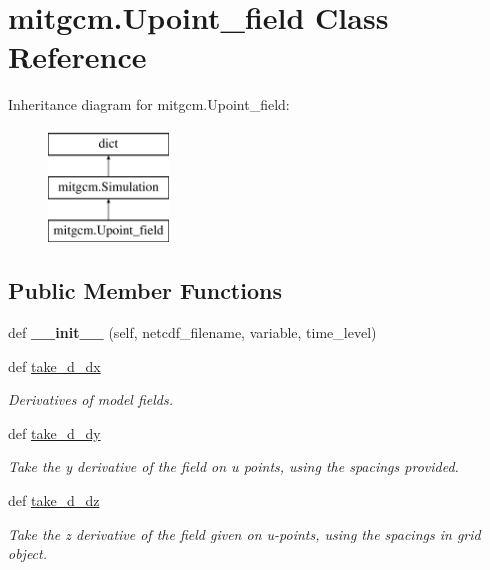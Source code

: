\hypertarget{classmitgcm_1_1Upoint__field}{}\section{mitgcm.\+Upoint\+\_\+field Class Reference}
\label{classmitgcm_1_1Upoint__field}
Inheritance diagram for mitgcm.\+Upoint\+\_\+field\+:\begin{figure}[H]
\begin{center}
\leavevmode
\includegraphics[height=3.000000cm]{classmitgcm_1_1Upoint__field}
\end{center}
\end{figure}
\subsection*{Public Member Functions}
\begin{DoxyCompactItemize}
\item 
\hypertarget{classmitgcm_1_1Upoint__field_a4b4f700e8387298d0a1373285594d0fb}{}def {\bfseries \+\_\+\+\_\+init\+\_\+\+\_\+} (self, netcdf\+\_\+filename, variable, time\+\_\+level)\label{classmitgcm_1_1Upoint__field_a4b4f700e8387298d0a1373285594d0fb}

\item 
def \hyperlink{classmitgcm_1_1Upoint__field_a3f136fd99e5a7ce04aef0f216bd32019}{take\+\_\+d\+\_\+dx}
\begin{DoxyCompactList}\small\item\em Derivatives of model fields. \end{DoxyCompactList}\item 
def \hyperlink{classmitgcm_1_1Upoint__field_acf9bf315e3d31834781c0642086a7802}{take\+\_\+d\+\_\+dy}
\begin{DoxyCompactList}\small\item\em Take the y derivative of the field on u points, using the spacings provided. \end{DoxyCompactList}\item 
def \hyperlink{classmitgcm_1_1Upoint__field_a8bfdba5354910eed3e9e8827d38608f8}{take\+\_\+d\+\_\+dz}
\begin{DoxyCompactList}\small\item\em Take the z derivative of the field given on u-\/points, using the spacings in grid object. \end{DoxyCompactList}\end{DoxyCompactItemize}
